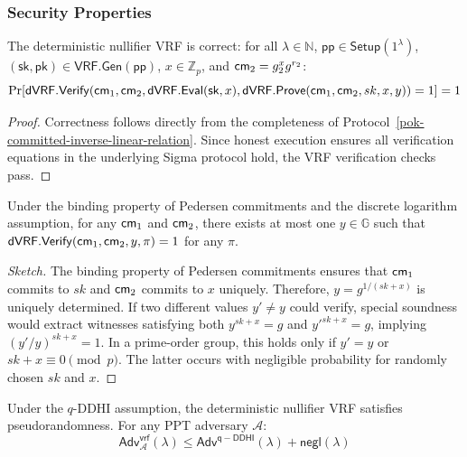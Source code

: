 \subsubsection{Security Properties}

\begin{theorem}[Correctness]
The deterministic nullifier VRF is correct: for all $\lambda \in \mathbb{N}$, $\mathsf{pp} \in \mathsf{Setup}(1^\lambda)$, $(\mathsf{sk}, \mathsf{pk}) \in \mathsf{VRF.Gen}(\mathsf{pp})$, $x \in \mathbb{Z}_p$, and $\mathsf{cm}_2 = g_2^{x} g^{r_2}$:
\[
\Pr[\mathsf{dVRF.Verify}(\mathsf{cm}_1, \mathsf{cm}_2, \mathsf{dVRF.Eval}(\mathsf{sk}, x), \mathsf{dVRF.Prove}(\mathsf{cm}_1, \mathsf{cm}_2, sk, x, y)) = 1] = 1
\]
\end{theorem}

\begin{proof}
Correctness follows directly from the completeness of Protocol~\ref{pok-committed-inverse-linear-relation}. Since honest execution ensures all verification equations in the underlying Sigma protocol hold, the VRF verification checks pass.
\end{proof}

\begin{theorem}[Uniqueness]
Under the binding property of Pedersen commitments and the discrete logarithm assumption, for any $\mathsf{cm}_1$ and $\mathsf{cm}_2$, there exists at most one $y \in \mathbb{G}$ such that $\mathsf{dVRF.Verify}(\mathsf{cm}_1, \mathsf{cm}_2, y, \pi) = 1$ for any $\pi$.
\end{theorem}

\begin{proof}[Sketch]
The binding property of Pedersen commitments ensures that $\mathsf{cm}_1$ commits to $sk$ and $\mathsf{cm}_2$ commits to $x$ uniquely. Therefore, $y = g^{1/(sk + x)}$ is uniquely determined. If two different values $y' \neq y$ could verify, special soundness would extract witnesses satisfying both $y^{sk+x} = g$ and $y'^{sk+x} = g$, implying $(y'/y)^{sk+x} = 1$. In a prime-order group, this holds only if $y' = y$ or $sk + x \equiv 0 \pmod{p}$. The latter occurs with negligible probability for randomly chosen $sk$ and $x$.
\end{proof}

\begin{theorem}[Pseudorandomness]
Under the $q$-DDHI assumption, the deterministic nullifier VRF satisfies pseudorandomness. For any PPT adversary $\mathcal{A}$:
\[
\mathsf{Adv}^{\mathsf{vrf}}_{\mathcal{A}}(\lambda) \leq \mathsf{Adv}^{\mathsf{q-DDHI}}(\lambda) + \mathsf{negl}(\lambda)
\]
\end{theorem}

